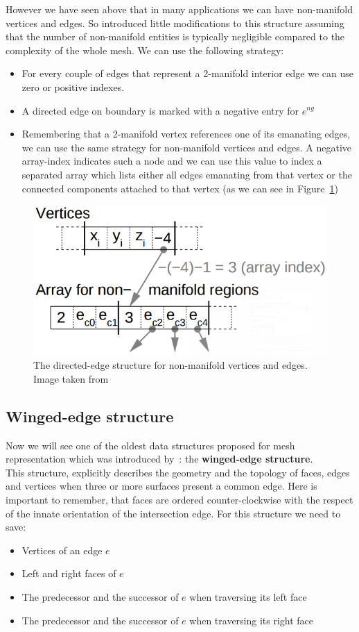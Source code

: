 However we have seen above that in many applications we can have non-manifold vertices and edges. So \cite{Campagna} introduced little modifications to this structure assuming that the number of non-manifold entities is typically 
negligible compared to the complexity of the whole mesh. We can use the following strategy:
\begin{itemize}
 \item For every couple of edges that represent a 2-manifold interior edge we can use zero or positive indexes.
 \item A directed edge on boundary is marked with a negative entry for $e^{ng}$
 \item Remembering that a 2-manifold vertex references one of its emanating edges, we can use the same strategy for non-manifold vertices and edges. A negative array-index indicates such a node and we can use this value to index a separated array which lists either all edges emanating from that vertex or the connected components attached to that vertex (as we can see in Figure~\ref{fig:directedEdge2})
\end{itemize}

\begin{figure}[htb] %
   \centering
   \includegraphics[width=0.45\linewidth]{images/directed-edge2.png}
   \caption[The directed-edge structure for non-manifold vertices and edges]{The directed-edge structure for non-manifold vertices and edges. Image taken from~\cite{Campagna}}
   \label{fig:directedEdge2}
\end{figure}

\subsection{Winged-edge structure}

Now we will see one of the oldest data structures proposed for mesh representation which was introduced by~\cite{Baumgart}: the \textbf{winged-edge structure}.\\
This structure, explicitly describes the geometry and the topology of faces, edges and vertices when three or more surfaces present a common edge. Here is important to remember, that faces are ordered counter-clockwise with the respect of the innate orientation of the intersection edge. For this structure we need to save:
\begin{itemize}
 \item Vertices of an edge $e$
 \item Left and right faces of $e$
 \item The predecessor and the successor of $e$ when traversing its left face
 \item The predecessor and the successor of $e$ when traversing its right face
\end{itemize}

